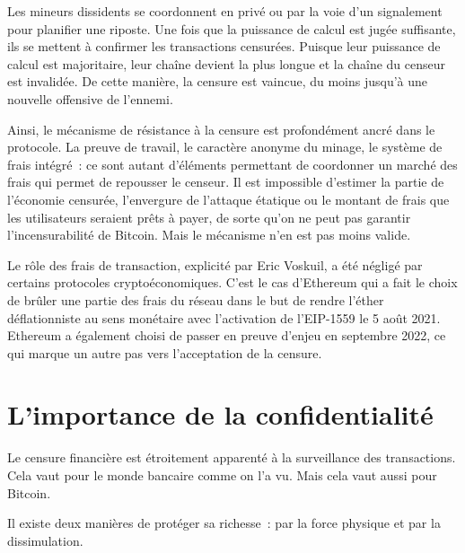 Les mineurs dissidents se coordonnent en privé ou par la voie d'un signalement pour planifier une riposte. Une fois que la puissance de calcul est jugée suffisante, ils se mettent à confirmer les transactions censurées. Puisque leur puissance de calcul est majoritaire, leur chaîne devient la plus longue et la chaîne du censeur est invalidée. De cette manière, la censure est vaincue, du moins jusqu'à une nouvelle offensive de l'ennemi.

Ainsi, le mécanisme de résistance à la censure est profondément ancré dans le protocole. La preuve de travail, le caractère anonyme du minage, le système de frais intégré~: ce sont autant d'éléments permettant de coordonner un marché des frais qui permet de repousser le censeur. Il est impossible d'estimer la partie de l'économie censurée, l'envergure de l'attaque étatique ou le montant de frais que les utilisateurs seraient prêts à payer, de sorte qu'on ne peut pas garantir l'incensurabilité de Bitcoin. Mais le mécanisme n'en est pas moins valide.

Le rôle des frais de transaction, explicité par Eric Voskuil, a été négligé par certains protocoles cryptoéconomiques. C'est le cas d'Ethereum qui a fait le choix de brûler une partie des frais du réseau dans le but de rendre l'éther déflationniste au sens monétaire avec l'activation de l'EIP-1559 le 5 août 2021. Ethereum a également choisi de passer en preuve d'enjeu en septembre 2022, ce qui marque un autre pas vers l'acceptation de la censure.

\section*{L'importance de la confidentialité}

Le censure financière est étroitement apparenté à la surveillance des transactions. Cela vaut pour le monde bancaire comme on l'a vu. Mais cela vaut aussi pour Bitcoin.


Il existe deux manières de protéger sa richesse~: par la force physique et par la dissimulation.

